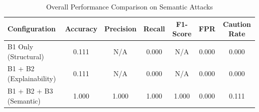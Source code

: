 \begin{table}[h]
\centering
\caption{Overall Performance Comparison on Semantic Attacks}
\label{tab:semantic_results}
\begin{tabular}{lcccccc}
\hline
\textbf{Configuration} & \textbf{Accuracy} & \textbf{Precision} & \textbf{Recall} & \textbf{F1-Score} & \textbf{FPR} & \textbf{Caution Rate} \\ \hline
B1 Only (Structural) & 0.111 & N/A & 0.000 & N/A & 0.000 & 0.000 \\
B1 + B2 (Explainability) & 0.111 & N/A & 0.000 & N/A & 0.000 & 0.000 \\
B1 + B2 + B3 (Semantic) & 1.000 & 1.000 & 1.000 & 1.000 & 0.000 & 0.111 \\
\hline
\end{tabular}
\end{table}
